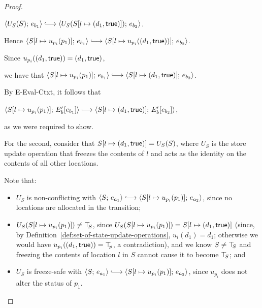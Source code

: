 \begin{proof}
\begin{enumerate}
\begin{enumerate}
\begin{itemize}
\begin{itemize}
          $\config{U_S(S)}{e_{b_1}} \parstepsto
          \config{U_S(\extS{S}{l}{d_1}{\frozentrue})}{e_{b_2}}$.

          Hence $\config{\extSRaw{S}{l}{u_{p_i}(p_1)}}{e_{b_1}}
          \parstepsto
          \config{\extSRaw{S}{l}{u_{p_i}(\state{d_1}{\frozentrue})}}{e_{b_2}}$.

          Since $u_{p_i}((d_1, \textsf{true})) =
          (d_1, \textsf{true})$,

          we have that
          $\config{\extSRaw{S}{l}{u_{p_i}(p_1)}}{e_{b_1}}
          \parstepsto
          \config{\extS{S}{l}{d_1}{\frozentrue}}{e_{b_2}}$.

          By {\sc E-Eval-Ctxt}, it follows that

          $\langle S[l \mapsto u_{p_i}(p_1)];\, E'_b\hspace{-0.5mm}\left[e_{b_1}\right] \rangle
          \longmapsto
          \langle S[l \mapsto (d_1, \textsf{true})];\, E'_b\hspace{-0.5mm}\left[e_{b_2}\right] \rangle$,

          as we were required to show.

          For the second, consider that
          $S[l \mapsto (d_1, \textsf{true})] = U_S(S)$, where $U_S$ is
          the store update operation that freezes the contents of $l$
          and acts as the identity on the contents of all other
          locations.

          Note that:
          \begin{itemize}
          \item $U_S$ is non-conflicting with $\config{S}{e_{a_1}}
            \parstepsto
            \config{\extSRaw{S}{l}{u_{p_i}(p_1)}}{e_{a_2}}$, since no
            locations are allocated in the transition;
          \item $U_S(S[l \mapsto u_{p_i}(p_1)]) \neq \top\hspace{-0.85mm}_{S}$,
            since $U_S(S[l \mapsto u_{p_i}(p_1)]) =
            S[l \mapsto (d_1, \textsf{true})]$ (since, by
            Definition~\ref{def:set-of-state-update-operations},
            $u_i(d_1) = d_1$; otherwise we would have
            $u_{p_i}((d_1, \textsf{true})) = \top\hspace{-0.85mm}_{p}$, a
            contradiction), and we know $S \neq \top\hspace{-0.85mm}_{S}$ and
            freezing the contents of location $l$ in $S$ cannot
            cause it to become $\top\hspace{-0.85mm}_{S}$; and
          \item $U_S$ is freeze-safe with $\config{S}{e_{a_1}}
            \parstepsto
            \config{\extSRaw{S}{l}{u_{p_i}(p_1)}}{e_{a_2}}$, since
            $u_{p_i}$ does not alter the status of $p_1$.


\end{itemize}
\end{itemize}
\end{itemize}
\end{enumerate}
\end{enumerate}
\end{proof}
